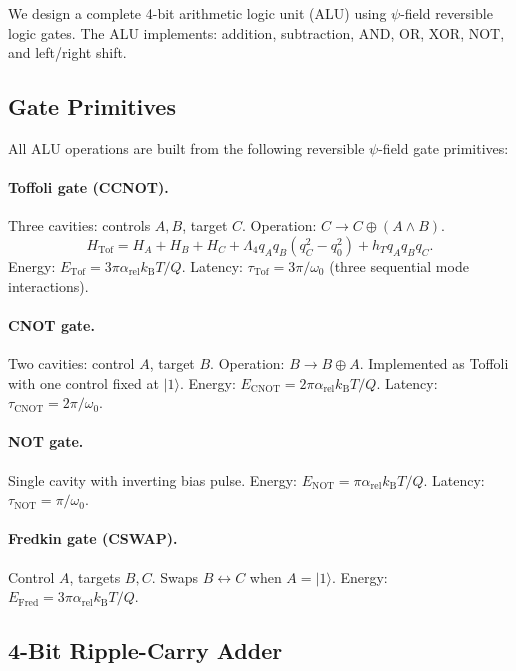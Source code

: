 \documentclass[11pt,twocolumn]{article}
\theoremstyle{definition}
\theoremstyle{remark}
\newcommand{\kB}{k_{\mathrm{B}}}
\begin{document}
We design a complete 4-bit arithmetic logic unit (ALU) using $\psi$-field
reversible logic gates. The ALU implements: addition, subtraction, AND,
OR, XOR, NOT, and left/right shift.

\subsection{Gate Primitives}\label{sec:alu_primitives}

All ALU operations are built from the following reversible $\psi$-field
gate primitives:

\paragraph{Toffoli gate (CCNOT).} Three cavities: controls $A, B$,
target $C$. Operation: $C \to C \oplus (A \wedge B)$.
\begin{equation}
H_{\mathrm{Tof}} = H_A + H_B + H_C + \Lambda_4 q_A q_B(q_C^2 - q_0^2) + h_T q_A q_B q_C.
\end{equation}
Energy: $E_{\mathrm{Tof}} = 3\pi\alpha_{\mathrm{rel}}\kB T/Q$.
Latency: $\tau_{\mathrm{Tof}} = 3\pi/\omega_0$ (three sequential mode
interactions).

\paragraph{CNOT gate.} Two cavities: control $A$, target $B$. Operation:
$B \to B \oplus A$. Implemented as Toffoli with one control fixed at
$|1\rangle$.
Energy: $E_{\mathrm{CNOT}} = 2\pi\alpha_{\mathrm{rel}}\kB T/Q$.
Latency: $\tau_{\mathrm{CNOT}} = 2\pi/\omega_0$.

\paragraph{NOT gate.} Single cavity with inverting bias pulse.
Energy: $E_{\mathrm{NOT}} = \pi\alpha_{\mathrm{rel}}\kB T/Q$.
Latency: $\tau_{\mathrm{NOT}} = \pi/\omega_0$.

\paragraph{Fredkin gate (CSWAP).} Control $A$, targets $B, C$. Swaps
$B \leftrightarrow C$ when $A = |1\rangle$.
Energy: $E_{\mathrm{Fred}} = 3\pi\alpha_{\mathrm{rel}}\kB T/Q$.

\subsection{4-Bit Ripple-Carry Adder}\label{sec:adder}
\end{document}
